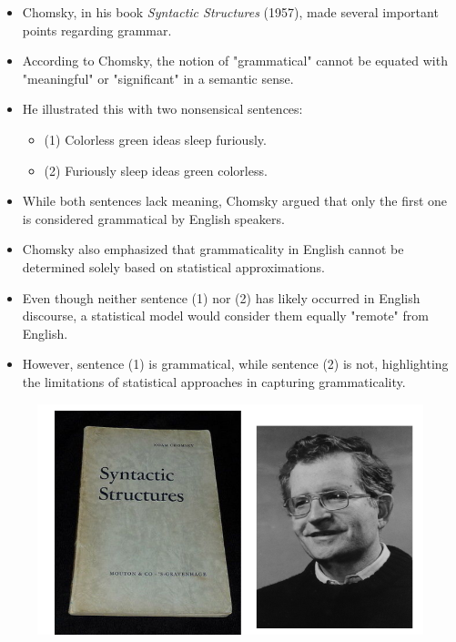 \documentclass{book}
\begin{document}
    \begin{itemize}
        \item Chomsky, in his book \textit{Syntactic Structures} (1957), made several important points regarding grammar. \cite{chomsky2009syntactic}
        \item According to Chomsky, the notion of "grammatical" cannot be equated with "meaningful" or "significant" in a semantic sense.
        \item He illustrated this with two nonsensical sentences:
        \begin{itemize}
            \scriptsize
            \item (1) Colorless green ideas sleep furiously.
            \item (2) Furiously sleep ideas green colorless.
        \end{itemize}
        \item While both sentences lack meaning, Chomsky argued that only the first one is considered grammatical by English speakers.
        \item Chomsky also emphasized that grammaticality in English cannot be determined solely based on statistical approximations.
        \item Even though neither sentence (1) nor (2) has likely occurred in English discourse, a statistical model would consider them equally "remote" from English.
        \item However, sentence (1) is grammatical, while sentence (2) is not, highlighting the limitations of statistical approaches in capturing grammaticality.
    \end{itemize}
     \begin{figure}[h]
        	\includegraphics[scale = 0.4]{pics/chomsky.png}
        \end{figure}      
\end{document}
